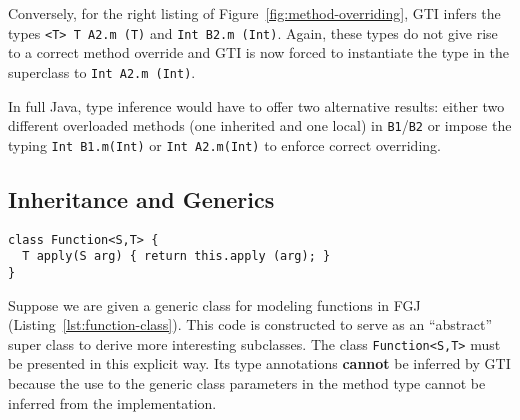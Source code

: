 Conversely, for the right listing of
Figure~\ref{fig:method-overriding}, GTI infers the types
\texttt{<T> T A2.m (T)} and \texttt{Int B2.m (Int)}. Again, these
types do not give rise to a correct method override and 
GTI is now forced to instantiate the type in the superclass to
\texttt{Int A2.m (Int)}.




In full Java, type inference would have to offer two alternative
results: either two different
overloaded methods (one inherited and one local) in \texttt{B1}/\texttt{B2} or
impose the typing \texttt{Int B1.m(Int)} or \texttt{Int A2.m(Int)} to enforce correct overriding. 


\subsection{Inheritance and Generics}
\label{sec:inheritance-generics}


\begin{lstlisting}[float,caption={Function class}, label={lst:function-class}]
class Function<S,T> {
  T apply(S arg) { return this.apply (arg); }
}
\end{lstlisting}
Suppose we are given a generic class for modeling functions in  FGJ (Listing~\ref{lst:function-class}).
This code is constructed to serve as an ``abstract'' super class to derive more
interesting subclasses.
The class \texttt{Function<S,T>} must be presented in this explicit
way. Its type annotations \textbf{cannot} be inferred by GTI because
the use to the generic class parameters in the method type cannot be inferred from the
implementation.

